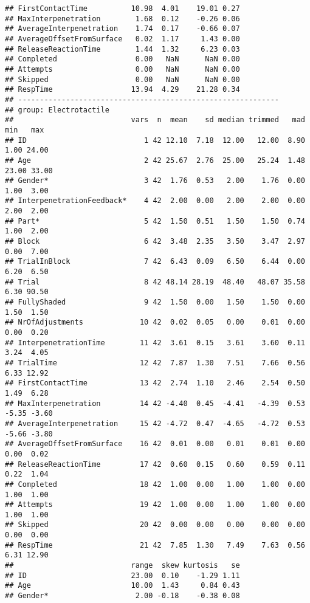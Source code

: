 \documentclass[
]{article}
\begin{document}
\begin{verbatim}
## FirstContactTime          10.98  4.01    19.01 0.27
## MaxInterpenetration        1.68  0.12    -0.26 0.06
## AverageInterpenetration    1.74  0.17    -0.66 0.07
## AverageOffsetFromSurface   0.02  1.17     1.43 0.00
## ReleaseReactionTime        1.44  1.32     6.23 0.03
## Completed                  0.00   NaN      NaN 0.00
## Attempts                   0.00   NaN      NaN 0.00
## Skipped                    0.00   NaN      NaN 0.00
## RespTime                  13.94  4.29    21.28 0.34
## ------------------------------------------------------------ 
## group: Electrotactile
##                           vars  n  mean    sd median trimmed   mad   min   max
## ID                           1 42 12.10  7.18  12.00   12.00  8.90  1.00 24.00
## Age                          2 42 25.67  2.76  25.00   25.24  1.48 23.00 33.00
## Gender*                      3 42  1.76  0.53   2.00    1.76  0.00  1.00  3.00
## InterpenetrationFeedback*    4 42  2.00  0.00   2.00    2.00  0.00  2.00  2.00
## Part*                        5 42  1.50  0.51   1.50    1.50  0.74  1.00  2.00
## Block                        6 42  3.48  2.35   3.50    3.47  2.97  0.00  7.00
## TrialInBlock                 7 42  6.43  0.09   6.50    6.44  0.00  6.20  6.50
## Trial                        8 42 48.14 28.19  48.40   48.07 35.58  6.30 90.50
## FullyShaded                  9 42  1.50  0.00   1.50    1.50  0.00  1.50  1.50
## NrOfAdjustments             10 42  0.02  0.05   0.00    0.01  0.00  0.00  0.20
## InterpenetrationTime        11 42  3.61  0.15   3.61    3.60  0.11  3.24  4.05
## TrialTime                   12 42  7.87  1.30   7.51    7.66  0.56  6.33 12.92
## FirstContactTime            13 42  2.74  1.10   2.46    2.54  0.50  1.49  6.28
## MaxInterpenetration         14 42 -4.40  0.45  -4.41   -4.39  0.53 -5.35 -3.60
## AverageInterpenetration     15 42 -4.72  0.47  -4.65   -4.72  0.53 -5.66 -3.80
## AverageOffsetFromSurface    16 42  0.01  0.00   0.01    0.01  0.00  0.00  0.02
## ReleaseReactionTime         17 42  0.60  0.15   0.60    0.59  0.11  0.22  1.04
## Completed                   18 42  1.00  0.00   1.00    1.00  0.00  1.00  1.00
## Attempts                    19 42  1.00  0.00   1.00    1.00  0.00  1.00  1.00
## Skipped                     20 42  0.00  0.00   0.00    0.00  0.00  0.00  0.00
## RespTime                    21 42  7.85  1.30   7.49    7.63  0.56  6.31 12.90
##                           range  skew kurtosis   se
## ID                        23.00  0.10    -1.29 1.11
## Age                       10.00  1.43     0.84 0.43
## Gender*                    2.00 -0.18    -0.38 0.08

\end{verbatim}
\end{document}
